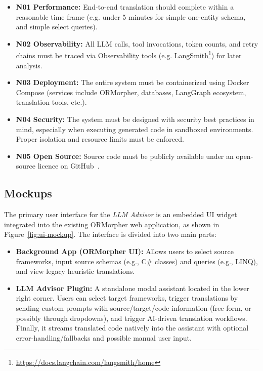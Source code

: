 \documentclass{article}
\begin{document}
\begin{itemize}
  \item \textbf{N01 Performance:} End-to-end translation should complete within a reasonable time frame (e.g. under 5 minutes for simple one-entity schema, and simple select queries).
  \item \textbf{N02 Observability:} All LLM calls, tool invocations, token counts, and retry chains must be traced via Observability tools (e.g. LangSmith\footnote{\url{https://docs.langchain.com/langsmith/home}}) for later analysis.
  \item \textbf{N03 Deployment:} The entire system must be containerized using Docker Compose (services include ORMorpher, databases, LangGraph ecosystem, translation tools, etc.).
  \item \textbf{N04 Security:} The system must be designed with security best practices in mind, especially when executing generated code in sandboxed environments. Proper isolation and resource limits must be enforced.
  \item \textbf{N05 Open Source:} Source code must be publicly available under an open-source licence on GitHub~\cite{uomrepo}.
\end{itemize}

\subsection{Mockups}

The primary user interface for the \emph{LLM Advisor} is an embedded UI widget integrated into the existing ORMorpher web application, as shown in Figure~\ref{fig:ui-mockup}. The interface is divided into two main parts:

\begin{itemize}
  \item \textbf{Background App (ORMorpher UI):} Allows users to select source frameworks, input source schemas (e.g., C\# classes) and queries (e.g., LINQ), and view legacy heuristic translations.
  \item \textbf{LLM Advisor Plugin:} A standalone modal assistant located in the lower right corner. Users can select target frameworks, trigger translations by sending custom prompts with source/target/code information (free form, or possibly through dropdowns), and trigger AI-driven translation workflows. Finally, it streams translated code natively into the assistant with optional error-handling/fallbacks and possible manual user input.
\end{itemize}
\end{document}
